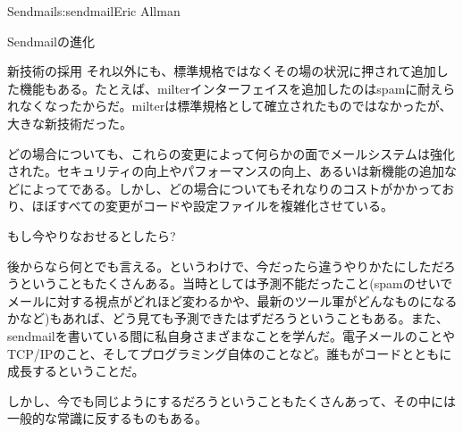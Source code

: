 \begin{aosachapter}{Sendmail}{s:sendmail}{Eric Allman}
\begin{aosasect1}{Sendmailの進化}
\begin{aosasect2}{新技術の採用}
それ以外にも、標準規格ではなくその場の状況に押されて追加した機能もある。たとえば、milterインターフェイスを追加したのはspamに耐えられなくなったからだ。milterは標準規格として確立されたものではなかったが、大きな新技術だった。

どの場合についても、これらの変更によって何らかの面でメールシステムは強化された。セキュリティの向上やパフォーマンスの向上、あるいは新機能の追加などによってである。しかし、どの場合についてもそれなりのコストがかかっており、ほぼすべての変更がコードや設定ファイルを複雑化させている。

\end{aosasect2}

\end{aosasect1}

\begin{aosasect1}{もし今やりなおせるとしたら?}

後からなら何とでも言える。というわけで、今だったら違うやりかたにしただろうということもたくさんある。当時としては予測不能だったこと(spamのせいでメールに対する視点がどれほど変わるかや、最新のツール軍がどんなものになるかなど)もあれば、どう見ても予測できたはずだろうということもある。また、sendmailを書いている間に私自身さまざまなことを学んだ。電子メールのことやTCP/IPのこと、そしてプログラミング自体のことなど。誰もがコードとともに成長するということだ。

しかし、今でも同じようにするだろうということもたくさんあって、その中には一般的な常識に反するものもある。


\end{aosasect1}
\end{aosachapter}

